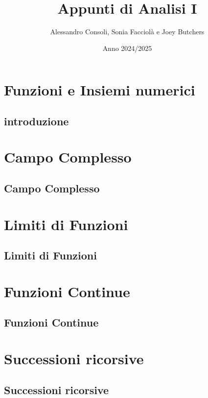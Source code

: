 \documentclass[a4paper,12pt]{report} %
\title{Appunti di Analisi I}
\author{Alessandro Consoli, Sonia Facciolà e Joey Butchers}
\date{Anno 2024/2025}
\begin{document}
    
    
    \tableofcontents


    \maketitle
    
\chapter{Funzioni e Insiemi numerici}

    \section{introduzione}

    

\chapter{Campo Complesso}

    \section{Campo Complesso}

    


\chapter{Limiti di Funzioni}

    \section{Limiti di Funzioni}

    



\chapter{Funzioni Continue}

    \section{Funzioni Continue}
    
    
    
\chapter{Successioni ricorsive}

    \section{Successioni ricorsive}
    
    


%


    
\end{document}

